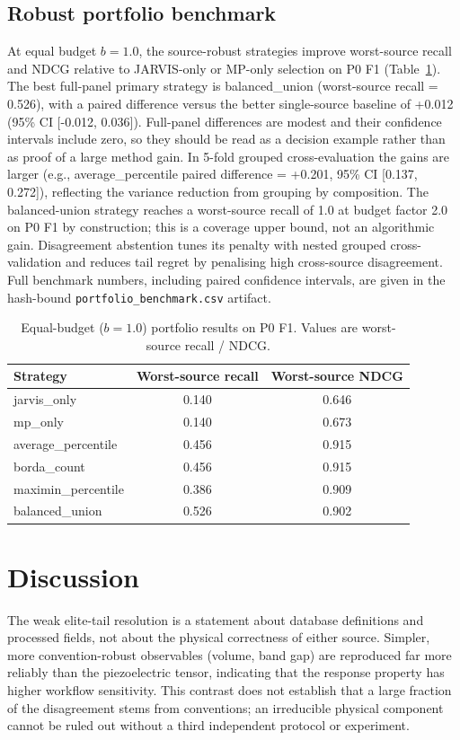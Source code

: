 \documentclass[11pt]{article}
\newcommand{\PrimaryBestStrategy}{balanced\_union}
\newcommand{\PrimaryBestWorstSourceRecall}{0.526}
\newcommand{\PrimaryBestPairedDiffRecall}{+0.012 (95\% CI [-0.012, 0.036])}
\begin{document}
\subsection{Robust portfolio benchmark}
At equal budget $b=1.0$, the source-robust strategies improve worst-source recall and NDCG relative to JARVIS-only or MP-only selection on P0 F1 (Table~\ref{tab:portfolio}).
The best full-panel primary strategy is \PrimaryBestStrategy{} (worst-source recall = \PrimaryBestWorstSourceRecall{}), with a paired difference versus the better single-source baseline of \PrimaryBestPairedDiffRecall{}.
Full-panel differences are modest and their confidence intervals include zero, so they should be read as a decision example rather than as proof of a large method gain.
In 5-fold grouped cross-evaluation the gains are larger (e.g., average\_percentile paired difference = +0.201, 95\% CI [0.137, 0.272]), reflecting the variance reduction from grouping by composition.
The balanced-union strategy reaches a worst-source recall of 1.0 at budget factor 2.0 on P0 F1 by construction; this is a coverage upper bound, not an algorithmic gain.
Disagreement abstention tunes its penalty with nested grouped cross-validation and reduces tail regret by penalising high cross-source disagreement.
Full benchmark numbers, including paired confidence intervals, are given in the hash-bound \texttt{portfolio\_benchmark.csv} artifact.

\begin{table}[htbp]
\centering
\caption{Equal-budget ($b=1.0$) portfolio results on P0 F1. Values are worst-source recall / NDCG.}
\label{tab:portfolio}
\begin{tabular}{lcc}
\toprule
Strategy & Worst-source recall & Worst-source NDCG \\
\midrule
jarvis\_only & 0.140 & 0.646 \\
mp\_only & 0.140 & 0.673 \\
average\_percentile & 0.456 & 0.915 \\
borda\_count & 0.456 & 0.915 \\
maximin\_percentile & 0.386 & 0.909 \\
balanced\_union & 0.526 & 0.902 \\
\bottomrule
\end{tabular}
\end{table}

\section{Discussion}
The weak elite-tail resolution is a statement about database definitions and processed fields, not about the physical correctness of either source.
Simpler, more convention-robust observables (volume, band gap) are reproduced far more reliably than the piezoelectric tensor, indicating that the response property has higher workflow sensitivity.
This contrast does not establish that a large fraction of the disagreement stems from conventions; an irreducible physical component cannot be ruled out without a third independent protocol or experiment.
\end{document}
